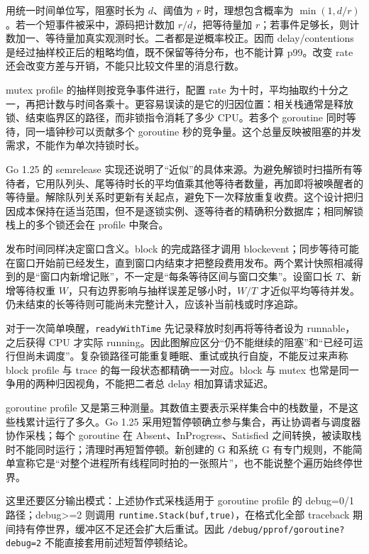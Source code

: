 \documentclass[UTF8,fontset=fandol,openany,11pt]{ctexbook}
\begin{document}
用统一时间单位写，阻塞时长为 \(d\)、阈值为 \(r\) 时，理想包含概率为 \(\min(1,d/r)\)。若一个短事件被采中，源码把计数加 \(r/d\)，把等待量加 \(r\)；若事件足够长，则计数加一、等待量加真实观测时长。二者都是逆概率校正。因而 delay/contentions 是经过抽样校正后的粗略均值，既不保留等待分布，也不能计算 p99。改变 rate 还会改变方差与开销，不能只比较文件里的消息行数。\cite{pp-mprof}


mutex profile 的抽样则按竞争事件进行，配置 rate 为十时，平均抽取约十分之一，再把计数与时间各乘十。更容易误读的是它的归因位置：相关栈通常是释放锁、结束临界区的路径，而非锁指令消耗了多少 CPU。若多个 goroutine 同时等待，同一墙钟秒可以贡献多个 goroutine 秒的竞争量。这个总量反映被阻塞的并发需求，不能作为单次持锁时长。\cite{pp-mprof}\cite{pp-sema}


Go 1.25 的 semrelease 实现还说明了“近似”的具体来源。为避免解锁时扫描所有等待者，它用队列头、尾等待时长的平均值乘其他等待者数量，再加即将被唤醒者的等待量。解除队列关系时更新有关起点，避免下一次释放重复收费。这个设计把归因成本保持在适当范围，但不是逐锁实例、逐等待者的精确积分数据库；相同解锁栈上的多个锁还会在 profile 中聚合。\cite{pp-sema}


发布时间同样决定窗口含义。block 的完成路径才调用 blockevent；同步等待可能在窗口开始前已经发生，直到窗口内结束才把整段费用发布。两个累计快照相减得到的是“窗口内新增记账”，不一定是“每条等待区间与窗口交集”。设窗口长 \(T\)、新增等待权重 \(W\)，只有边界影响与抽样误差足够小时，\(W/T\) 才近似平均等待并发。仍未结束的长等待则可能尚未完整计入，应该补当前栈或时序追踪。\cite{pp-sema}\cite{pp-mprof}


对于一次简单唤醒，\texttt{readyWithTime} 先记录释放时刻再将等待者设为 runnable，之后获得 CPU 才实际 running。因此图解应区分“仍不能继续的阻塞”和“已经可运行但尚未调度”。复杂锁路径可能重复睡眠、重试或执行自旋，不能反过来声称 block profile 与 trace 的每一段状态都精确一一对应。block 与 mutex 也常是同一争用的两种归因视角，不能把二者总 delay 相加算请求延迟。\cite{pp-sema}


goroutine profile 又是第三种测量。其数值主要表示采样集合中的栈数量，不是这些栈累计运行了多久。Go 1.25 采用短暂停顿确立参与集合，再让协调者与调度器协作采栈；每个 goroutine 在 Absent、InProgress、Satisfied 之间转换，被读取栈时不能同时运行；清理时再短暂停顿。新创建的 G 和系统 G 有专门规则，不能简单宣称它是“对整个进程所有线程同时拍的一张照片”，也不能说整个遍历始终停世界。\cite{pp-goroutine}


这里还要区分输出模式：上述协作式采栈适用于 goroutine profile 的 debug=0/1 路径；debug>=2 则调用 \texttt{runtime.\allowbreak{}Stack(buf,\allowbreak{}true)}，在格式化全部 traceback 期间持有停世界，缓冲区不足还会扩大后重试。因此 \texttt{/\allowbreak{}debug/\allowbreak{}pprof/\allowbreak{}goroutine?debug=2} 不能直接套用前述短暂停顿结论。\cite{pp-goroutine}
\end{document}
